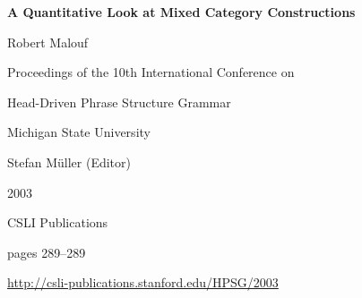 \documentclass[a4paper,11pt]{article}
\begin{document}
\begin{center}
  {\huge\bf A Quantitative Look at Mixed Category Constructions\par}

  \bigskip

  {\LARGE Robert Malouf\par}

  \vspace*{3\bigskipamount}

  Proceedings of the 10th International Conference on\par Head-Driven Phrase Structure Grammar

  \bigskip

  Michigan State University

  \medskip

  Stefan M{\"u}ller (Editor)

  \medskip

  2003

  \medskip

  CSLI Publications

  \medskip

  pages 289--289

  \medskip

  \url{http://csli-publications.stanford.edu/HPSG/2003}
\end{center}

\newpage

        
\end{document}

